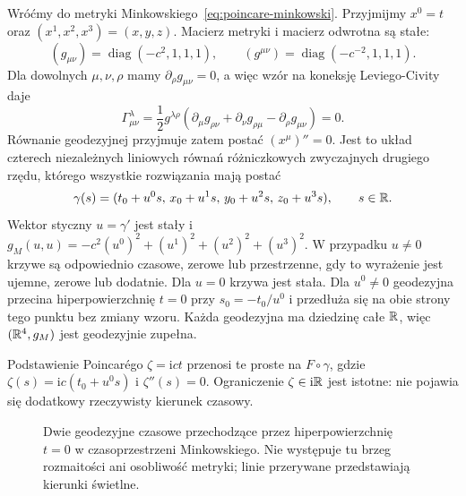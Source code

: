 \begin{przyklad}
\label{prz:poincare-geodezyjne}
Wróćmy do metryki Minkowskiego~\eqref{eq:poincare-minkowski}.
Przyjmijmy $x^0=t$ oraz $(x^1,x^2,x^3)=(x,y,z)$.
Macierz metryki i macierz odwrotna są stałe:
\[
 (g_{\mu\nu})=\operatorname{diag}(-c^2,1,1,1),\qquad
 (g^{\mu\nu})=\operatorname{diag}(-c^{-2},1,1,1).
\]
Dla dowolnych $\mu,\nu,\rho$ mamy
$\partial_\rho g_{\mu\nu}=0$, a więc wzór
na koneksję Leviego-Civity daje
\begin{equation}\label{eq:poincare-christoffel}
 \Gamma^\lambda_{\mu\nu}
 =\frac12g^{\lambda\rho}
 (\partial_\mu g_{\rho\nu}+\partial_\nu g_{\rho\mu}
 -\partial_\rho g_{\mu\nu})=0.
\end{equation}
Równanie geodezyjnej przyjmuje zatem postać
$(x^\mu)''=0$. Jest to układ czterech niezależnych
liniowych równań różniczkowych zwyczajnych drugiego
rzędu, którego wszystkie rozwiązania mają postać
\begin{equation}\label{eq:poincare-geodezyjne}
 \gamma(s)=(t_0+u^0s,\,x_0+u^1s,\,
 y_0+u^2s,\,z_0+u^3s),\qquad s\in\mathbb{R}.
\end{equation}
Wektor styczny $u=\gamma'$ jest stały i
$g_M(u,u)=-c^2(u^0)^2+(u^1)^2+(u^2)^2+(u^3)^2$.
W przypadku $u\ne0$ krzywe są odpowiednio czasowe,
zerowe lub przestrzenne, gdy to wyrażenie jest
ujemne, zerowe lub dodatnie. Dla $u=0$ krzywa jest stała.
Dla $u^0\neq0$ geodezyjna przecina hiperpowierzchnię
$t=0$ przy $s_0=-t_0/u^0$ i przedłuża się na obie
strony tego punktu bez zmiany wzoru.
Każda geodezyjna ma dziedzinę całe $\mathbb{R}$,
więc $(\mathbb{R}^4,g_M)$ jest geodezyjnie zupełna.

Podstawienie Poincarégo $\zeta=\mathrm{i}ct$ przenosi
te proste na $F\circ\gamma$, gdzie
$\zeta(s)=\mathrm{i}c(t_0+u^0s)$ i $\zeta''(s)=0$.
Ograniczenie $\zeta\in\mathrm{i}\mathbb{R}$ jest istotne:
nie pojawia się dodatkowy rzeczywisty kierunek czasowy.

\begin{figure}[htbp]
\centering
{}
\caption{Dwie geodezyjne czasowe przechodzące przez
hiperpowierzchnię $t=0$ w czasoprzestrzeni Minkowskiego.
Nie występuje tu brzeg rozmaitości ani osobliwość
metryki; linie przerywane przedstawiają kierunki świetlne.}
\label{fig:poincare-geodezyjne-zero}
\end{figure}
\end{przyklad}

